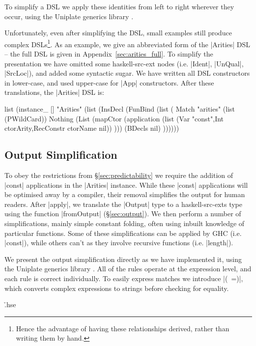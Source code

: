 \documentclass[preprint,draft]{sigplanconf}
\begin{document}
To simplify a DSL we apply these identities from left to right wherever they occur, using the Uniplate generics library \cite{me:uniplate}.

Unfortunately, even after simplifying the DSL, small examples still produce complex DSLs\footnote{Hence the advantage of having these relationships derived, rather than writing them by hand.}. As an example, we give an abbreviated form of the |Arities| DSL -- the full DSL is given in Appendix~\ref{sec:arities_full}. To simplify the presentation we have omitted some haskell-src-ext nodes (i.e. |Ident|, |UnQual|, |SrcLoc|), and added some syntactic sugar. We have written all DSL constructors in lower-case, and used upper-case for |App| constructors. After these translations, the |Arities| DSL is:

\ignore\begin{code}
list (instance_ [] "Arities" (list (InsDecl (FunBind (list (
    Match "arities"
        (list (PWildCard))
        Nothing
        (List (mapCtor (application
            (list (Var "const",Int ctorArity,RecConstr ctorName nil))
        )))
        (BDecls nil)
))))))
\end{code}

\subsection{Output Simplification}
\label{sec:output_simplify}

To obey the restrictions from \S\ref{sec:predictability} we require the addition of |const| applications in the |Arities| instance. While these |const| applications will be optimised away by a compiler, their removal simplifies the output for human readers. After |apply|, we translate the |Output| type to a haskell-src-exts type using the function |fromOutput| (\S\ref{sec:output}). We then perform a number of simplifications, mainly simple constant folding, often using inbuilt knowledge of particular functions. Some of these simplifications can be applied by GHC (i.e. |const|), while others can't as they involve recursive functions (i.e. |length|).

We present the output simplification directly as we have implemented it, using the Uniplate generics library \cite{me:uniplate}. All of the rules operate at the expression level, and each rule is correct individually. To easily express matches we introduce |(~=)|, which converts complex expressions to strings before checking for equality.

\h{.hse}
\end{document}
